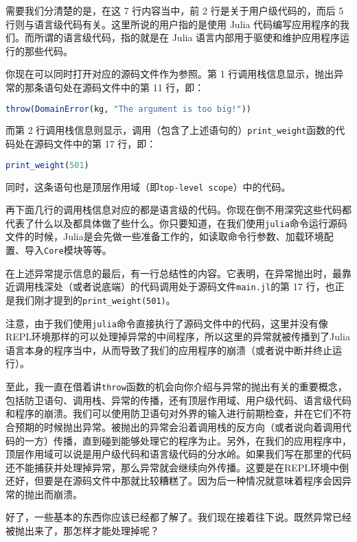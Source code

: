 需要我们分清楚的是，在这 7 行内容当中，前 2 行是关于用户级代码的，而后 5 行则与语言级代码有关。这里所说的用户指的是使用 Julia 代码编写应用程序的我们。而所谓的语言级代码，指的就是在 Julia 语言内部用于驱使和维护应用程序运行的那些代码。

你现在可以同时打开对应的源码文件作为参照。第 1 行调用栈信息显示，抛出异常的那条语句处在源码文件中的第 11 行，即：

\begin{lstlisting}[language=julia]
throw(DomainError(kg, "The argument is too big!"))
\end{lstlisting}

而第 2 行调用栈信息则显示，调用（包含了上述语句的）\verb`print_weight`函数的代码处在源码文件中的第 17 行，即：

\begin{lstlisting}[language=julia]
print_weight(501)
\end{lstlisting}

同时，这条语句也是顶层作用域（即\verb`top-level scope`）中的代码。

再下面几行的调用栈信息对应的都是语言级的代码。你现在倒不用深究这些代码都代表了什么以及都具体做了些什么。你只要知道，在我们使用\verb`julia`命令运行源码文件的时候，Julia是会先做一些准备工作的，如读取命令行参数、加载环境配置、导入\verb`Core`模块等等。 

在上述异常提示信息的最后，有一行总结性的内容。它表明，在异常抛出时，最靠近调用栈深处（或者说底端）的代码调用处于源码文件\verb`main.jl`的第 17 行，也正是我们刚才提到的\verb`print_weight(501)`。

注意，由于我们使用\verb`julia`命令直接执行了源码文件中的代码，这里并没有像REPL环境那样的可以处理掉异常的中间程序，所以这里的异常就被传播到了Julia语言本身的程序当中，从而导致了我们的应用程序的崩溃（或者说中断并终止运行）。

至此，我一直在借着讲\verb`throw`函数的机会向你介绍与异常的抛出有关的重要概念，包括防卫语句、调用栈、异常的传播，还有顶层作用域、用户级代码、语言级代码和程序的崩溃。我们可以使用防卫语句对外界的输入进行前期检查，并在它们不符合预期的时候抛出异常。被抛出的异常会沿着调用栈的反方向（或者说向着调用代码的一方）传播，直到碰到能够处理它的程序为止。另外，在我们的应用程序中，顶层作用域可以说是用户级代码和语言级代码的分水岭。如果我们写在那里的代码还不能捕获并处理掉异常，那么异常就会继续向外传播。这要是在REPL环境中倒还好，但要是在源码文件中那就比较糟糕了。因为后一种情况就意味着程序会因异常的抛出而崩溃。

好了，一些基本的东西你应该已经都了解了。我们现在接着往下说。既然异常已经被抛出来了，那怎样才能处理掉呢？

